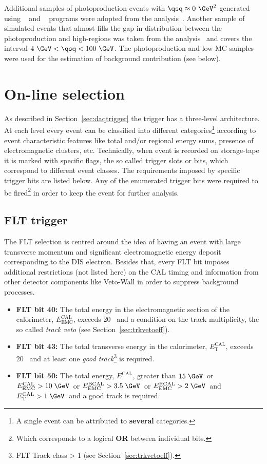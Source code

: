 Additional samples of photoproduction events with $\qsq\approx 0~\GeV^2$ generated using \herwig~\cite{cpc:67:465, jhep01:2001:010} and \pythia~\cite{cpc:82:74} programs were adopted from the analysis~\cite{np:b864:1}. Another sample of simulated events that almost fills the gap in \qsq distribution between the photoproduction and high-\qsq regions was taken from the analysis~\cite{thesis:perrey:2011} and covers the interval $4~\GeV<\qsq<100~\GeV$. The photoproduction and low-\qsq MC samples were used for the estimation of background contribution (see below).

\section{On-line selection}
\label{sec:onlineselect}
As described in Section~\ref{sec:daqtrigger} the \zeus trigger has a three-level architecture. At each level every event can be classified into different categories\footnote{A single event can be attributed to \textbf{several} categories.} according to event characteristic features like total and/or regional energy sums, presence of electromagnetic clusters, etc. Technically, when event is recorded on storage-tape it is marked with specific flags, the so called trigger slots or bits, which correspond to different event classes. The requirements imposed by specific trigger bits are listed below. Any of the enumerated trigger bits were required to be fired\footnote{Which corresponds to a logical \textbf{OR} between individual bits.} in order to keep the event for further analysis. 

\subsection{FLT trigger}
\label{subsec:fltcuts}
The FLT selection is centred around the idea of having an event with large transverse momentum and significant electromagnetic energy deposit corresponding to the DIS electron. Besides that, every FLT bit imposes additional restrictions (not listed here) on the CAL timing and information from other detector components like Veto-Wall in order to suppress background processes.
\begin{itemize}
	\item \textbf{FLT bit 40:} The total energy in the electromagnetic section of the calorimeter, $E_\text{EMC}^\text{CAL}$, exceeds 20 \GeV\, and a condition on the track multiplicity, the so called \textit{track veto} (see Section~\ref{sec:trkvetoeff}).
	\item \textbf{FLT bit 43:} The total transverse energy in the calorimeter, $E_\text{T}^\text{CAL}$, exceeds 20 \GeV\, and at least one \textit{good track}\footnote{FLT Track class > 1 (see Section~\ref{sec:trkvetoeff}).} is required.
	\item \textbf{FLT bit 50:} The total energy, $E^\text{CAL}$, greater than $15\; \GeV$\, or $E_\text{EMC}^\text{CAL} > 10\; \GeV\,$ or $E_\text{EMC}^\text{BCAL} > 3.5\; \GeV$\, or $E_\text{EMC}^\text{RCAL} > 2\; \GeV$\, and $E_\text{T}^\text{CAL} > 1\; \GeV$\, and a good track is required.
\end{itemize}

